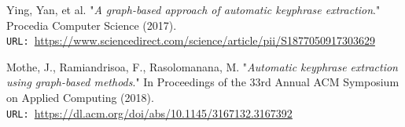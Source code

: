 \documentclass[12pt]{article}
\numberwithin{equation}{section}
\begin{document}
\begin{spacing}{1.5}
\begin{thebibliography}{8}
		Ying, Yan, et al. "\textit{A graph-based approach of automatic keyphrase extraction}." Procedia Computer Science (2017).\\
		\texttt{URL: }\url{https://www.sciencedirect.com/science/article/pii/S1877050917303629}
		
		Mothe, J., Ramiandrisoa, F., Rasolomanana, M. "\textit{Automatic keyphrase extraction using graph-based methods}." In Proceedings of the 33rd Annual ACM Symposium on Applied Computing (2018).\\
		\texttt{URL: }\url{https://dl.acm.org/doi/abs/10.1145/3167132.3167392}
		
		
		
		
	\end{thebibliography}

	\end{spacing}
	
\end{document}
